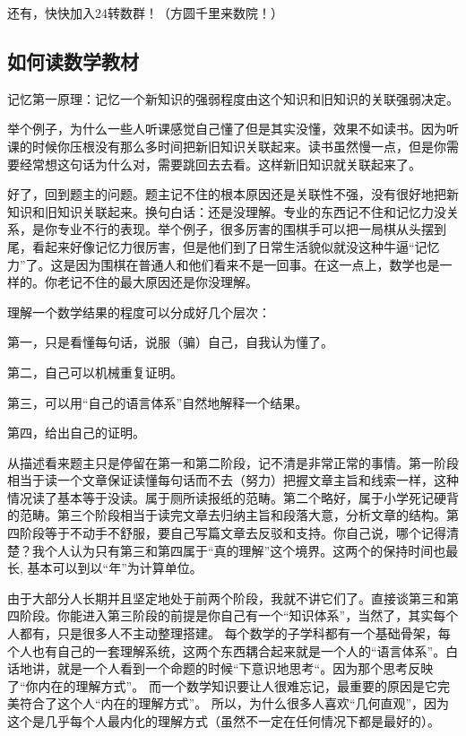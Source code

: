 \documentclass[12pt, a4paper, oneside]{ctexart}
\begin{document}
还有，快快加入24转数群！（方圆千里来数院！）

\newpage
\subsection{如何读数学教材}
记忆第一原理：记忆一个新知识的强弱程度由这个知识和旧知识的关联强弱决定。

举个例子，为什么一些人听课感觉自己懂了但是其实没懂，效果不如读书。因为听课的时候你压根没有那么多时间把新旧知识关联起来。读书虽然慢一点，但是你需要经常想这句话为什么对，需要跳回去去看。这样新旧知识就关联起来了。

好了，回到题主的问题。题主记不住的根本原因还是关联性不强，没有很好地把新知识和旧知识关联起来。换句白话：还是没理解。专业的东西记不住和记忆力没关系，是你专业不行的表现。举个例子，很多厉害的围棋手可以把一局棋从头摆到尾，看起来好像记忆力很厉害，但是他们到了日常生活貌似就没这种牛逼“记忆力”了。这是因为围棋在普通人和他们看来不是一回事。在这一点上，数学也是一样的。你老记不住的最大原因还是你没理解。

理解一个数学结果的程度可以分成好几个层次：

第一，只是看懂每句话，说服（骗）自己，自我认为懂了。

第二，自己可以机械重复证明。

第三，可以用“自己的语言体系”自然地解释一个结果。

第四，给出自己的证明。

从描述看来题主只是停留在第一和第二阶段，记不清是非常正常的事情。第一阶段相当于读一个文章保证读懂每句话而不去（努力）把握文章主旨和线索一样，这种情况读了基本等于没读。属于厕所读报纸的范畴。第二个略好，属于小学死记硬背的范畴。第三个阶段相当于读完文章去归纳主旨和段落大意，分析文章的结构。第四阶段等于不动手不舒服，要自己写篇文章去反驳和支持。你自己说，哪个记得清楚？我个人认为只有第三和第四属于“真的理解”这个境界。这两个的保持时间也最长, 基本可以到以“年”为计算单位。

由于大部分人长期并且坚定地处于前两个阶段，我就不讲它们了。直接谈第三和第四阶段。你能进入第三阶段的前提是你自己有一个“知识体系”，当然了，其实每个人都有，只是很多人不主动整理搭建。 每个数学的子学科都有一个基础骨架，每个人也有自己的一套理解系统，这两个东西耦合起来就是一个人的“语言体系”。白话地讲，就是一个人看到一个命题的时候“下意识地思考“。因为那个思考反映了“你内在的理解方式”。 而一个数学知识要让人很难忘记，最重要的原因是它完美符合了这个人“内在的理解方式”。 所以，为什么很多人喜欢“几何直观”，因为这个是几乎每个人最内化的理解方式（虽然不一定在任何情况下都是最好的）。
\end{document}
